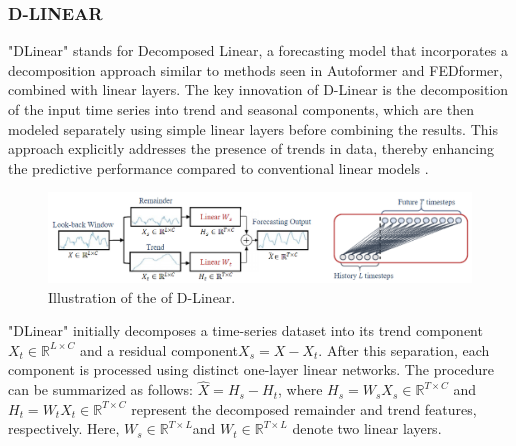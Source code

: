 \documentclass{ieeeojies}
\begin{document}
\subsubsection{D-LINEAR}
"DLinear\cite{model_Dlinear}" stands for Decomposed Linear, a forecasting model that incorporates a decomposition approach similar to methods seen in Autoformer and FEDformer, combined with linear layers.  The key innovation of D-Linear is the decomposition of the input time series into trend and seasonal components, which are then modeled separately using simple linear layers before combining the results. This approach explicitly addresses the presence of trends in data, thereby enhancing the predictive performance compared to conventional linear models \cite{model_Dlinear}.
\begin{figure}[H]
  \centering
  \begin{minipage}{0.9\linewidth}
    \centering
    \includegraphics[width=\linewidth]{image/D-linear_1.png}
    \caption{Illustration of the of D-Linear\cite{model_Dlinear}.}
    \label{fig8}
  \end{minipage}
\end{figure}
\noindent "DLinear" initially decomposes a time-series dataset into its trend component \(X_{t} \in \mathbb{R}^{L \times C}\)\cite{model_Dlinear} and a residual component\(X_{s} = X-X_t\)\cite{model_Dlinear}. After this separation, each component is processed using distinct one-layer linear networks. The procedure can be summarized as follows: \(\hat {X} = H_s-H_t\)\cite{model_Dlinear}, where \(H_{s} = W_s X_s \in \mathbb{R}^{T \times C}\)\cite{model_Dlinear}  and  \(H_{t} = W_t X_t \in \mathbb{R}^{T \times C}\)\cite{model_Dlinear}  represent the decomposed remainder and trend features, respectively. Here, \(W_{s} \in \mathbb{R}^{T \times L}\)and \(W_{t} \in \mathbb{R}^{T \times L}\)\cite{model_Dlinear} denote two linear layers.
\end{document}
